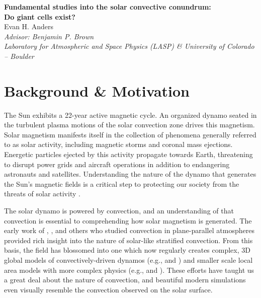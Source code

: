 \documentclass[aasms,12pt]{article}
\begin{document}
\begin{center}
   \large\textbf{Fundamental studies into the solar convective conundrum:}\\
   \large\textbf{Do giant cells exist?}\\
   \vspace{0.2cm}
   \large{Evan H. Anders}\\
   \vspace{0.2cm}
   \normalsize\textit{Advisor: Benjamin P. Brown}\\
   \normalsize\textit{Laboratory for Atmospheric and Space Physics (LASP) \& University of Colorado -- Boulder}\\
\end{center}

\vspace{-0.6cm}
\section{Background \& Motivation}
The Sun exhibits a 22-year active magnetic cycle.
An organized dynamo seated in the turbulent plasma
motions of the solar convection zone drives this magnetism.
Solar magnetism manifests itself in the collection of phenomena generally
referred to as solar activity, including magnetic storms and coronal mass
ejections.  Energetic particles ejected by this activity propagate towards Earth, 
threatening to disrupt power grids and aircraft operations in addition to endangering astronauts and satellites.
Understanding the nature of the dynamo that generates the Sun's magnetic fields is a critical
step to protecting our society from the threats of solar activity \citep{charbonneau2014}.

The solar dynamo is powered by convection, and
an understanding of that convection is essential to comprehending
how solar magnetism is generated. The early work of \cite{graham1975}, \cite{hurlburt&all1984},
and others who studied convection in plane-parallel atmospheres
provided rich insight into the nature of solar-like stratified convection.  From this basis,
the field has blossomed into one which now regularly creates complex, 3D global models of convectively-driven
dynamos (e.g., \cite{brown&all2010} and \cite{guerrero&all2016})
and smaller scale local area models with more complex physics 
(e.g., \cite{stein&nordlund2012} and \cite{rempel2014}).
These efforts have taught us a great deal about the nature of convection, and
beautiful modern simulations even visually resemble the convection observed on the solar surface.
\end{document}
